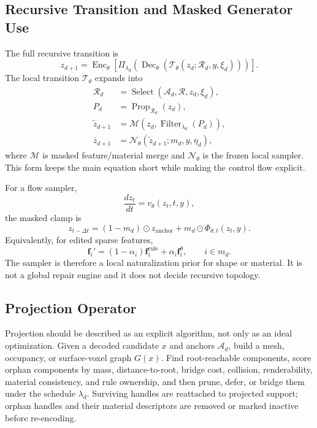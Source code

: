 \subsection{Recursive Transition and Masked Generator Use}

The full recursive transition is
\begin{equation}
  z_{d+1}=
  \operatorname{Enc}_{\theta}
  \left[
  \Pi_{\lambda_d}
  \left(
  \operatorname{Dec}_{\theta}
  \left(
  \mathcal T_\theta(z_d;\mathcal R_d,y,\xi_d)
  \right)
  \right)
  \right].
  \label{eq:reviewer-compact-transition}
\end{equation}
The local transition $\mathcal T_\theta$ expands into
\begin{align}
  \mathcal R_d&=\operatorname{Select}(\mathcal A_d,\mathcal R,z_d,\xi_d),\\
  P_d&=\operatorname{Prop}_{\mathcal R_d}(z_d),\\
  \tilde z_{d+1}&=\mathcal M(z_d,\operatorname{Filter}_{\lambda_d}(P_d)),\\
  \bar z_{d+1}&=\mathcal N_\theta(\tilde z_{d+1};m_d,y,\eta_d),
\end{align}
where $\mathcal M$ is masked feature/material merge and $\mathcal N_\theta$ is
the frozen local sampler. This form keeps the main equation short while making
the control flow explicit.

For a flow sampler,
\begin{equation}
  \frac{dz_t}{dt}=v_\theta(z_t,t,y),
\end{equation}
the masked clamp is
\begin{equation}
  z_{t-\Delta t}=
  (1-m_d)\odot z_{\mathrm{anchor}}
  +m_d\odot\Phi_{\theta,t}(z_t,y).
  \label{eq:reviewer-masked-flow}
\end{equation}
Equivalently, for edited sparse features,
\begin{equation}
  \mathbf f_i'=
  (1-\alpha_i)\mathbf f_i^{\mathrm{rule}}
  +\alpha_i\mathbf f_i^{\theta},\qquad i\in m_d.
\end{equation}
The sampler is therefore a local naturalization prior for shape or material. It
is not a global repair engine and it does not decide recursive topology.

\subsection{Projection Operator}

Projection should be described as an explicit algorithm, not only as an ideal
optimization. Given a decoded candidate $x$ and anchors $\mathcal A_d$, build a
mesh, occupancy, or surface-voxel graph $G(x)$. Find root-reachable components,
score orphan components by mass, distance-to-root, bridge cost, collision,
renderability, material consistency, and rule ownership, and then prune,
defer, or bridge them under the schedule $\lambda_d$. Surviving handles are
reattached to projected support; orphan handles and their material descriptors
are removed or marked inactive before re-encoding.

